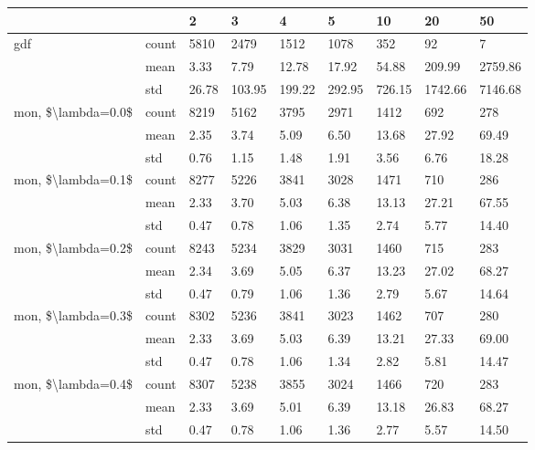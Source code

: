 \begin{tabular}{lllllllll}
\toprule
                   &     &    2  &     3  &     4  &     5  &     10 &      20 &      50 \\
\midrule
gdf & count &  5810 &   2479 &   1512 &   1078 &    352 &      92 &       7 \\
                   & mean &  3.33 &   7.79 &  12.78 &  17.92 &  54.88 &  209.99 & 2759.86 \\
                   & std & 26.78 & 103.95 & 199.22 & 292.95 & 726.15 & 1742.66 & 7146.68 \\
mon, \$\textbackslash lambda=0.0\$ & count &  8219 &   5162 &   3795 &   2971 &   1412 &     692 &     278 \\
                   & mean &  2.35 &   3.74 &   5.09 &   6.50 &  13.68 &   27.92 &   69.49 \\
                   & std &  0.76 &   1.15 &   1.48 &   1.91 &   3.56 &    6.76 &   18.28 \\
mon, \$\textbackslash lambda=0.1\$ & count &  8277 &   5226 &   3841 &   3028 &   1471 &     710 &     286 \\
                   & mean &  2.33 &   3.70 &   5.03 &   6.38 &  13.13 &   27.21 &   67.55 \\
                   & std &  0.47 &   0.78 &   1.06 &   1.35 &   2.74 &    5.77 &   14.40 \\
mon, \$\textbackslash lambda=0.2\$ & count &  8243 &   5234 &   3829 &   3031 &   1460 &     715 &     283 \\
                   & mean &  2.34 &   3.69 &   5.05 &   6.37 &  13.23 &   27.02 &   68.27 \\
                   & std &  0.47 &   0.79 &   1.06 &   1.36 &   2.79 &    5.67 &   14.64 \\
mon, \$\textbackslash lambda=0.3\$ & count &  8302 &   5236 &   3841 &   3023 &   1462 &     707 &     280 \\
                   & mean &  2.33 &   3.69 &   5.03 &   6.39 &  13.21 &   27.33 &   69.00 \\
                   & std &  0.47 &   0.78 &   1.06 &   1.34 &   2.82 &    5.81 &   14.47 \\
mon, \$\textbackslash lambda=0.4\$ & count &  8307 &   5238 &   3855 &   3024 &   1466 &     720 &     283 \\
                   & mean &  2.33 &   3.69 &   5.01 &   6.39 &  13.18 &   26.83 &   68.27 \\
                   & std &  0.47 &   0.78 &   1.06 &   1.36 &   2.77 &    5.57 &   14.50 \\

\end{tabular}
